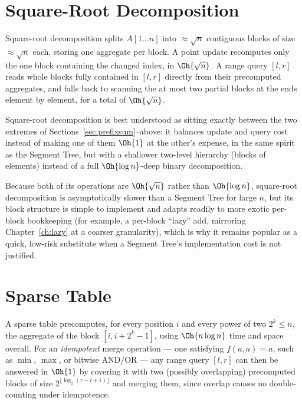 \section{Square-Root Decomposition}
\label{sec:sqrtdecomp}
Square-root decomposition splits $A[1\ldots n]$ into $\approx\sqrt{n}$ contiguous blocks of size $\approx\sqrt{n}$ each, storing one aggregate per block. A point update recomputes only the one block containing the changed index, in $\Oh{\sqrt n}$. A range query $[l,r]$ reads whole blocks fully contained in $[l,r]$ directly from their precomputed aggregates, and falls back to scanning the at most two partial blocks at the ends element by element, for a total of $\Oh{\sqrt n}$.

\begin{keyidea}
Square-root decomposition is best understood as sitting exactly between the two extremes of Sections~\ref{sec:prefixsum}--above: it balances update and query cost instead of making one of them $\Oh{1}$ at the other's expense, in the same spirit as the Segment Tree, but with a shallower two-level hierarchy (blocks of elements) instead of a full $\Oh{\log n}$-deep binary decomposition.
\end{keyidea}

Because both of its operations are $\Oh{\sqrt n}$ rather than $\Oh{\log n}$, square-root decomposition is asymptotically slower than a Segment Tree for large $n$, but its block structure is simple to implement and adapts readily to more exotic per-block bookkeeping (for example, a per-block ``lazy'' add, mirroring Chapter~\ref{ch:lazy} at a coarser granularity), which is why it remains popular as a quick, low-risk substitute when a Segment Tree's implementation cost is not justified.

\section{Sparse Table}
\label{sec:sparsetable}
A sparse table precomputes, for every position $i$ and every power of two $2^{k}\le n$, the aggregate of the block $[i,i+2^{k}-1]$, using $\Oh{n\log n}$ time and space overall. For an \emph{idempotent} merge operation --- one satisfying $f(a,a)=a$, such as $\min$, $\max$, or bitwise $\mathrm{AND}$/$\mathrm{OR}$ --- any range query $[l,r]$ can then be answered in $\Oh{1}$ by covering it with two (possibly overlapping) precomputed blocks of size $2^{\lfloor\log_2(r-l+1)\rfloor}$ and merging them, since overlap causes no double-counting under idempotence.

